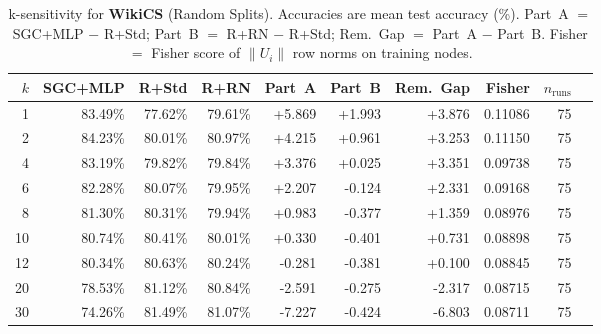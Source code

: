 \begin{table}[t]
\centering\small\setlength{\tabcolsep}{5pt}
\caption{k-sensitivity for \textbf{WikiCS} (Random Splits). Accuracies are mean test accuracy (\%). Part~A $=$ SGC+MLP $-$ R+Std; Part~B $=$ R+RN $-$ R+Std; Rem.~Gap $=$ Part~A $-$ Part~B. Fisher $=$ Fisher score of $\|U_i\|$ row norms on training nodes.}
\label{tab:exp8_per_dataset_wikics_random}
\begin{tabular}{rrrrrrrrrr}
\toprule
$k$ & SGC+MLP & R+Std & R+RN & Part~A & Part~B & Rem.~Gap & Fisher & $n_{\mathrm{runs}}$ \\
\midrule
1 & 83.49\% & 77.62\% & 79.61\% & +5.869 & +1.993 & +3.876 & 0.11086 & 75 \\
2 & 84.23\% & 80.01\% & 80.97\% & +4.215 & +0.961 & +3.253 & 0.11150 & 75 \\
4 & 83.19\% & 79.82\% & 79.84\% & +3.376 & +0.025 & +3.351 & 0.09738 & 75 \\
6 & 82.28\% & 80.07\% & 79.95\% & +2.207 & -0.124 & +2.331 & 0.09168 & 75 \\
8 & 81.30\% & 80.31\% & 79.94\% & +0.983 & -0.377 & +1.359 & 0.08976 & 75 \\
10 & 80.74\% & 80.41\% & 80.01\% & +0.330 & -0.401 & +0.731 & 0.08898 & 75 \\
12 & 80.34\% & 80.63\% & 80.24\% & -0.281 & -0.381 & +0.100 & 0.08845 & 75 \\
20 & 78.53\% & 81.12\% & 80.84\% & -2.591 & -0.275 & -2.317 & 0.08715 & 75 \\
30 & 74.26\% & 81.49\% & 81.07\% & -7.227 & -0.424 & -6.803 & 0.08711 & 75 \\
\bottomrule
\end{tabular}
\end{table}
